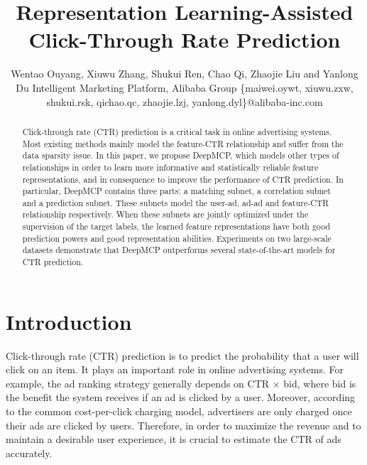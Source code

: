 \documentclass{article}
\title{Representation Learning-Assisted Click-Through Rate Prediction}
\author{
    Wentao Ouyang, Xiuwu Zhang, Shukui Ren, Chao Qi, Zhaojie Liu \textnormal{and} Yanlong Du
    \affiliations
    Intelligent Marketing Platform, Alibaba Group
    \emails
    \{maiwei.oywt, xiuwu.zxw, shukui.rsk, qichao.qc, zhaojie.lzj, yanlong.dyl\}@alibaba-inc.com
}
\begin{document}
\maketitle

\begin{abstract}
Click-through rate (CTR) prediction is a critical task in online advertising systems. Most existing methods mainly model the feature-CTR relationship and suffer from the data sparsity issue. In this paper, we propose DeepMCP, which models other types of relationships in order to learn more informative and statistically reliable feature representations, and in consequence to improve the performance of CTR prediction. In particular, DeepMCP contains three parts: a matching subnet, a correlation subnet and a prediction subnet. These subnets model the user-ad, ad-ad and feature-CTR relationship respectively. When these subnets are jointly optimized under the supervision of the target labels, the learned feature representations have both good prediction powers and good representation abilities. Experiments on two large-scale datasets demonstrate that DeepMCP outperforms several state-of-the-art models for CTR prediction.
\end{abstract}

\section{Introduction}
Click-through rate (CTR) prediction is to predict the probability that a user will click on an item. It plays an important role in online advertising systems. For example, the ad ranking strategy generally depends on CTR $\times$ bid, where bid is the benefit the system receives if an ad is clicked by a user. Moreover, according to the common cost-per-click charging model, advertisers are only charged once their ads are clicked by users. Therefore, in order to maximize the revenue and to maintain a desirable user experience, it is crucial to estimate the CTR of ads accurately.
\end{document}
